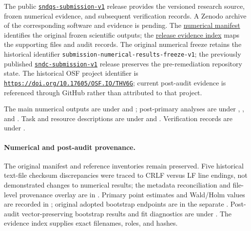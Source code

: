 \documentclass[pdflatex,sn-basic,Numbered]{sn-jnl}
\begin{document}
The public \href{https://github.com/Brandon-Shen/few-qubit-qnn-snr/releases/tag/sndqs-submission-v1}{\texttt{sndqs-submission-v1}} release provides the versioned research source, frozen numerical evidence, and subsequent verification records. A Zenodo archive of the corresponding software and evidence is pending. The \href{https://github.com/Brandon-Shen/few-qubit-qnn-snr/blob/sndqs-submission-v1/results/final_submission_v1/manifest.json}{numerical manifest} identifies the original frozen scientific outputs; the \href{https://github.com/Brandon-Shen/few-qubit-qnn-snr/blob/sndqs-submission-v1/submission/sndqs-submission-v1/EVIDENCE_INDEX.md}{release evidence index} maps the supporting files and audit records. The original numerical freeze retains the historical identifier \nolinkurl{submission-numerical-results-freeze-v1}; the previously published \href{https://github.com/Brandon-Shen/few-qubit-qnn-snr/releases/tag/sndc-submission-v1}{\texttt{sndc-submission-v1}} release preserves the pre-remediation repository state. The historical OSF project identifier is \href{https://doi.org/10.17605/OSF.IO/THV6G}{\nolinkurl{https://doi.org/10.17605/OSF.IO/THV6G}}; current post-audit evidence is referenced through GitHub rather than attributed to that project.

The main numerical outputs are under  and ; post-primary analyses are under , , and . Task and resource descriptions are under  and . Verification records are under .

\paragraph{Numerical and post-audit provenance.}
The original manifest and reference inventories remain preserved. Five historical text-file checksum discrepancies were traced to CRLF versus LF line endings, not demonstrated changes to numerical results; the metadata reconciliation and file-level provenance overlay are in . Primary point estimates and Wald/Holm values are recorded in ; original adopted bootstrap endpoints are in the separate . Post-audit vector-preserving bootstrap results and fit diagnostics are under . The evidence index supplies exact filenames, roles, and hashes.
\end{document}
